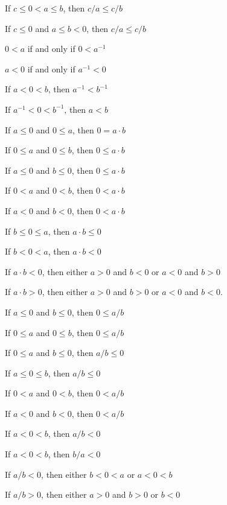 \documentclass{article}
\let\xrbreak\medbreak
\begin{document}
\begin{thm}
\item\label{xreal1:120} If $c\leq 0<a\leq b$, then $c/a\leq c/b$
\item\label{xreal1:121} If $c\leq0$ and $a\leq b<0$, then $c/a\leq c/b$
\item\label{xreal1:122} $0<a$ if and only if $0<a^{-1}$
\item\label{xreal1:123} $a<0$ if and only if $a^{-1}<0$
\item\label{xreal1:124} If $a<0<b$, then $a^{-1}<b^{-1}$
\item\label{xreal1:125} If $a^{-1}<0<b^{-1}$, then $a<b$
  \xrbreak
\item\label{xreal1:126} If $a\leq 0$ and $0\leq a$, then $0=a\cdot b$
\item\label{xreal1:127} If $0\leq a$ and $0\leq b$,
  then $0\leq a\cdot b$
\item\label{xreal1:128} If $a\leq0$ and $b\leq0$, then $0\leq a\cdot b$
\item\label{xreal1:129} If $0<a$ and $0<b$, then $0<a\cdot b$
\item\label{xreal1:130} If $a<0$ and $b<0$, then $0<a\cdot b$
\item\label{xreal1:131} If $b\leq0\leq a$, then $a\cdot b\leq0$
\item\label{xreal1:132} If $b<0<a$, then $a\cdot b<0$
\item\label{xreal1:133} If $a\cdot b<0$, then either $a>0$ and $b<0$ or
  $a<0$ and $b>0$
\item\label{xreal1:134} If $a\cdot b>0$, then either $a>0$ and $b>0$ or
  $a<0$ and $b<0$.
\item\label{xreal1:135} If $a\leq0$ and $b\leq0$, then $0\leq a/b$
\item\label{xreal1:136} If $0\leq a$ and $0\leq b$, then $0\leq a/b$
\item\label{xreal1:137} If $0\leq a$ and $b\leq 0$, then $a/b\leq0$
\item\label{xreal1:138} If $a\leq0\leq b$, then $a/b\leq0$
\item\label{xreal1:139} If $0<a$ and $0<b$, then $0<a/b$
\item\label{xreal1:140} If $a<0$ and $b<0$, then $0<a/b$
\item\label{xreal1:141} If $a<0<b$, then $a/b<0$
\item\label{xreal1:142} If $a<0<b$, then $b/a<0$
\item\label{xreal1:143} If $a/b<0$, then either $b<0<a$ or $a<0<b$
\item\label{xreal1:144} If $a/b>0$, then either $a>0$ and $b>0$ or $b<0$

\end{thm}
\end{document}
